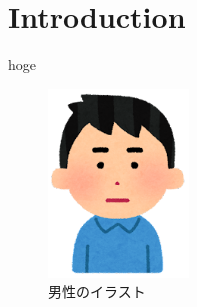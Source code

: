 \section{Introduction}
\label{sec:introduction}

hoge \cite{sample}

\begin{figure}[h]
	\begin{center}
		\includegraphics[height=5cm]{image/man.png}
		\caption{男性のイラスト}
		\label{fig:man}
	\end{center}
\end{figure}
